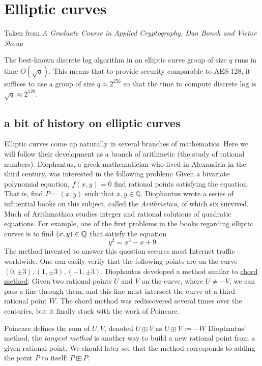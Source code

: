 \chapter{Elliptic curves}
Taken from \emph{A Graduate Course in Applied Cryptography, Dan Boneh and Victor Shoup}

The best-known discrete log algorithm in an elliptic curve group of size $q$ runs in time $O(\sqrt{q})$. 
This means that to provide security comparable to AES-128, it suffices to use a group of size $q \approx 2^{256}$ 
so that the time to compute discrete log is $\sqrt{q} \approx 2^{128}$.

\section{a bit of history on elliptic curves}
Elliptic curves come up naturally in several branches of mathematics.
Here we will follow their development as a branch of arithmetic (the study of rational numbers).
Diophantus, a greek mathematician who lived in Alexandria in the third century, was interested 
in the following problem: Given a bivariate polynomial equation, $f(x,y)=0$ find 
rational points satisfying the equation. That is, find $P=(x,y)$ such that $x,y\in\mathbb{Q}$.
Diophantus wrote a series of influential books on this subject, called the \emph{Arithmetica}, of which six survived.
Much of Arithmathica studies integer and rational solutions of quadratic equations.
For example, one of the first problems in the books regarding elliptic curves is to find $(x,y) \in \mathbb{Q}$
 that satisfy the equation $$ y^{2}=x^3 - x + 9$$
The method invented to answer this question secures most Internet traffic worldwide.
One can easily verify that the following points are on the curve $(0, \pm3), (1, \pm3), (-1, \pm 3)$.
Diophantus developed a method similar to \underline{chord method}:
Given two rational points $U$ and $V$ on the curve, where $U\neq -V$, we can pass a line through them,
 and this line must intersect the curve at a third rational point $W$. 
The chord method was rediscovered several times over the centuries, but it finally stuck with the work of Poincare.

Poincare defines the sum of $U, V$, denoted $U \boxplus V$ as $U \boxplus V := -W$
Diophantus' method, the \emph{tangent method} is another way to build a new rational point from a given rational point. 
We should later see that the method corresponds to adding the point $P$ to itself: $P\boxplus P$.
